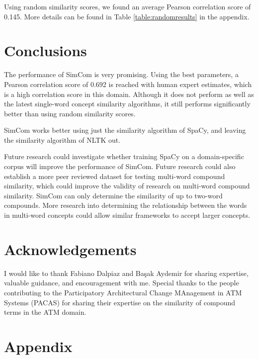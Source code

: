 \documentclass{article}
\begin{document}
Using random similarity scores, we found an average Pearson correlation score of 0.145. More details can be found in Table \ref{table:randomresults} in the appendix.

\section{Conclusions} \label{sec:conclusions}

The performance of SimCom is very promising. Using the best parameters, a Pearson correlation score of 0.692 is reached with human expert estimates, which is a high correlation score in this domain. Although it does not perform as well as the latest single-word concept similarity algorithms, it still performs significantly better than using random similarity scores. 

SimCom works better using just the similarity algorithm of SpaCy, and leaving the similarity algorithm of NLTK out.

Future research could investigate whether training SpaCy on a domain-specific corpus will improve the performance of SimCom. Future research could also establish a more peer reviewed dataset for testing multi-word compound similarity, which could improve the validity of research on multi-word compound similarity. SimCom can only determine the similarity of up to two-word compounds. More research into determining the relationship between the words in multi-word concepts could allow similar frameworks to accept larger concepts.

\section{Acknowledgements} \label{sec:ack}

I would like to thank Fabiano Dalpiaz and Ba\c sak Aydemir for sharing expertise, valuable guidance, and encouragement with me. Special thanks to the people contributing to the Participatory Architectural Change MAnagement in ATM Systems (PACAS) for sharing their expertise on the similarity of compound terms in the ATM domain.

\printbibliography

\section{Appendix}
\end{document}
